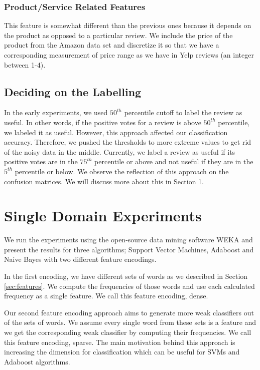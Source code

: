 \documentclass[letterpaper]{article}
\begin{document}
\subsubsection{Product/Service Related Features} 
This feature is somewhat different than the previous ones
because it depends on the product as opposed to a particular
review. We include the price of the product from the Amazon data set and
discretize it so that we have a corresponding measurement of price
range as we have in Yelp reviews (an integer between 1-4). 

\subsection{Deciding on the Labelling}
In the early experiments, we used $50^{th}$ percentile cutoff to label the
review as useful. In other words, if the positive votes for a review is above
$50^{th}$ percentile, we labeled it as useful. However, this approach affected our classification
accuracy. Therefore, we pushed the thresholds to more extreme values
to get rid of the noisy data in the middle. Currently, we label a review as useful
if its positive votes are in the $75^{th}$ percentile or above and not
useful if they are 
in the $5^{th}$ percentile or below. We observe the reflection of this
approach on the confusion matrices. We will discuss more about this in
Section \ref{sec:single_domain}.


\section{Single Domain Experiments}
\label{sec:single_domain}  
We run the experiments using the open-source data mining software WEKA \cite{weka}
and present the results for three algorithms; Support Vector Machines, Adaboost and
Naive Bayes with two different feature encodings. 

In the first encoding, we have different sets of words as we described in
Section \ref{sec:features}. We compute the frequencies of those
words and use each calculated frequency as a single feature. We call
this feature encoding, dense. 

Our second feature encoding approach aims to generate more weak classifiers out of the sets
of words. We assume every single word from these sets is a feature and
we get the corresponding weak classifier by computing their
frequencies. We call this feature encoding, sparse. The main
motivation behind this approach is increasing the dimension for
classification which can be useful for SVMs and Adaboost algorithms.
\end{document}
